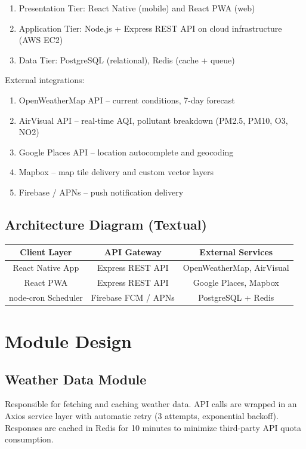 \documentclass[12pt]{article}
\begin{document}
\begin{enumerate}
    \item Presentation Tier: React Native (mobile) and React PWA (web)
    \item Application Tier: Node.js + Express REST API on cloud infrastructure (AWS EC2)
    \item Data Tier: PostgreSQL (relational), Redis (cache + queue)
\end{enumerate}

External integrations:

\begin{enumerate}
    \item OpenWeatherMap API -- current conditions, 7-day forecast
    \item AirVisual API -- real-time AQI, pollutant breakdown (PM2.5, PM10, O3, NO2)
    \item Google Places API -- location autocomplete and geocoding
    \item Mapbox -- map tile delivery and custom vector layers
    \item Firebase / APNs -- push notification delivery
\end{enumerate}

\subsection{Architecture Diagram (Textual)}

\begin{center}
\begin{tabular}{|c|c|c|}
\hline
\textbf{Client Layer} & \textbf{API Gateway} & \textbf{External Services} \\
\hline
React Native App & Express REST API & OpenWeatherMap, AirVisual \\
\hline
React PWA & Express REST API & Google Places, Mapbox \\
\hline
node-cron Scheduler & Firebase FCM / APNs & PostgreSQL + Redis \\
\hline
\end{tabular}
\end{center}

\section{Module Design}

\subsection{Weather Data Module}
Responsible for fetching and caching weather data. API calls are wrapped in an Axios service layer with automatic retry (3 attempts, exponential backoff). Responses are cached in Redis for 10 minutes to minimize third-party API quota consumption.
\end{document}
